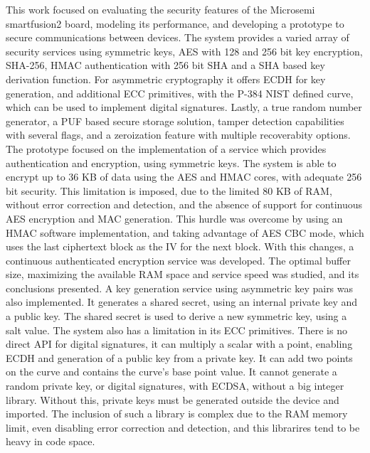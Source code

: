 \cleardoublepage
\label{chap:conclusion}

This work focused on evaluating the security features of the Microsemi smartfusion2 board, modeling its performance, and developing a prototype to secure communications between devices.
The system provides a varied array of security services using symmetric keys, AES with 128 and 256 bit key encryption, SHA-256, HMAC authentication with 256 bit SHA and a SHA based key derivation function. For asymmetric cryptography it offers ECDH for key generation, and additional ECC primitives, with the P-384 NIST defined curve, which can be used to implement digital signatures. Lastly, a true random number generator, a PUF based secure storage solution, tamper detection capabilities with several flags, and a zeroization feature with multiple recoverabity options.
The prototype focused on the implementation of a service which provides authentication and encryption, using symmetric keys. The system is able to encrypt up to 36 KB of data using the AES and HMAC cores, with adequate 256 bit security. This limitation is imposed, due to the limited 80 KB of RAM, without error correction and detection, and the absence of support for continuous AES encryption and MAC generation. This hurdle was overcome by using an HMAC software implementation, and taking advantage of AES CBC mode, which uses the last ciphertext block as the IV for the next block. With this changes, a continuous authenticated encryption service was developed. The optimal buffer size, maximizing the available RAM space and service speed was studied, and its conclusions presented.
A key generation service using asymmetric key pairs was also implemented. It generates a shared secret, using an internal private key and a public key. The shared secret is used to derive a new symmetric key, using a salt value.
The system also has a limitation in its ECC primitives. There is no direct API for digital signatures, it can multiply a scalar with a point, enabling ECDH and generation of a public key from a private key. It can add two points on the curve and contains the curve's base point value. It cannot generate a random private key, or digital signatures, with ECDSA, without a big integer library. Without this, private keys must be generated outside the device and imported. The inclusion of such a library is complex due to the RAM memory limit, even disabling error correction and detection, and this librarires tend to be heavy in code space. 
